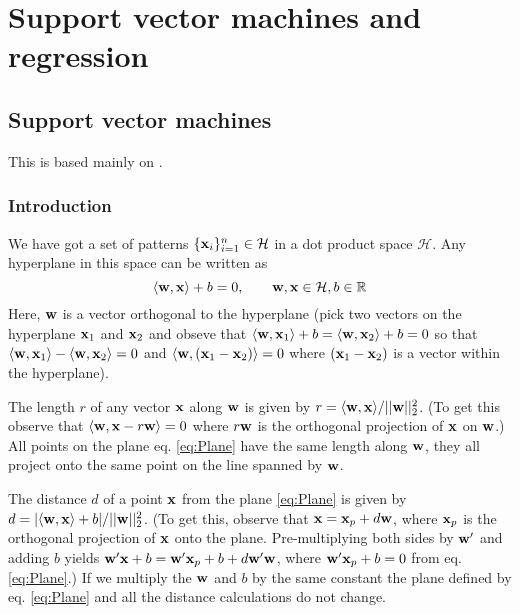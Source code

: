 \clearpage

\section{Support vector machines and regression}

\subsection{Support vector machines}

This is based mainly on \cite{Scholkopf2002}.

\subsubsection{Introduction}
We have got a set of patterns $\{\mathbf{x}_i\}_{i=1}^n \in \mathcal{H}$ in a dot product space $\mathcal{H}$.
Any hyperplane in this space can be written as
\begin{equation}\label{eq:Plane}
 \langle \mathbf{w},\mathbf{x} \rangle + b = 0, \qquad \mathbf{w},\mathbf{x} \in \mathcal{H}, b \in \mathbb{R}
\end{equation}
Here, $\mathbf{w}$ is a vector orthogonal to the hyperplane (pick two vectors on the hyperplane $\mathbf{x}_1$ and $\mathbf{x}_2$ and obseve that $\langle \mathbf{w},\mathbf{x}_1 \rangle + b = \langle \mathbf{w},\mathbf{x}_2 \rangle + b = 0$ so that $\langle \mathbf{w},\mathbf{x}_1 \rangle - \langle \mathbf{w},\mathbf{x}_2 \rangle = 0$ and $\langle \mathbf{w}, (\mathbf{x}_1 - \mathbf{x}_2) \rangle = 0$ where $(\mathbf{x}_1 - \mathbf{x}_2)$ is a vector within the hyperplane).

The length $r$ of any vector $\mathbf{x}$ along $\mathbf{w}$ is given by $r = \langle \mathbf{w},\mathbf{x} \rangle / || \mathbf{w}||_2^2$. (To get this observe that $\langle \mathbf{w}, \mathbf{x} - r \mathbf{w} \rangle = 0$ where $r\mathbf{w}$ is the orthogonal projection of $\mathbf{x}$ on $\mathbf{w}$.)
All points on the plane eq. \eqref{eq:Plane} have the same length along $\mathbf{w}$, they all project onto the same point on the line spanned by $\mathbf{w}$.

The distance $d$ of a point $\mathbf{x}$ from the plane \eqref{eq:Plane} is given by $d = | \langle \mathbf{w},\mathbf{x} \rangle + b | / || \mathbf{w}||_2^2$. (To get this, observe that $\mathbf{x} = \mathbf{x}_p + d \mathbf{w}$, where $\mathbf{x}_p$ is the orthogonal projection of $\mathbf{x}$ onto the plane. Pre-multiplying both sides by $\mathbf{w}'$ and adding $b$ yields $\mathbf{w'x}+b = \mathbf{w'x}_p+b + d \mathbf{w'w}$, where $\mathbf{w'x}_p+b = 0$ from eq. \eqref{eq:Plane}.)
If we multiply the $\mathbf{w}$ and $b$ by the same constant the plane defined by eq. \eqref{eq:Plane} and all the distance calculations do not change.


